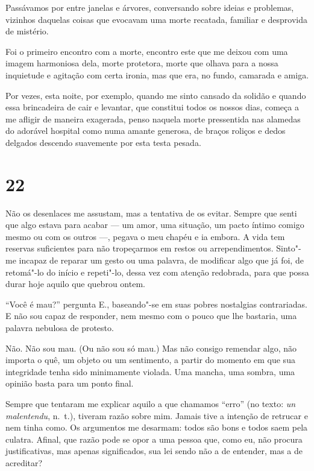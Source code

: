 Passávamos por entre janelas e árvores, conversando sobre ideias e
problemas, vizinhos daquelas coisas que evocavam uma morte recatada,
familiar e desprovida de mistério.

Foi o primeiro encontro com a morte, encontro este que me deixou com uma
imagem harmoniosa dela, morte protetora, morte que olhava para a nossa
inquietude e agitação com certa ironia, mas que era, no fundo, camarada
e amiga.

Por vezes, esta noite, por exemplo, quando me sinto cansado da solidão e
quando essa brincadeira de cair e levantar, que constitui todos os
nossos dias, começa a me afligir de maneira exagerada, penso naquela
morte pressentida nas alamedas do adorável hospital como numa amante
generosa, de braços roliços e dedos delgados descendo suavemente por
esta testa pesada.

\section{22}

Não os desenlaces me assustam, mas a tentativa de os evitar. Sempre que
senti que algo estava para acabar --- um amor, uma situação, um pacto
íntimo comigo mesmo ou com os outros ---, pegava o meu chapéu e ia embora.
A vida tem reservas suficientes para não tropeçarmos em restos ou
arrependimentos. Sinto"-me incapaz de reparar um gesto ou uma palavra, de
modificar algo que já foi, de retomá"-lo do início e repeti"-lo, dessa vez
com atenção redobrada, para que possa durar hoje aquilo que quebrou
ontem.

``Você é mau?'' pergunta E., baseando"-se em suas pobres nostalgias
contrariadas. E não sou capaz de responder, nem mesmo com o pouco que
lhe bastaria, uma palavra nebulosa de protesto.

Não. Não sou mau. (Ou não sou só mau.) Mas não consigo remendar algo,
não importa o quê, um objeto ou um sentimento, a partir do momento em
que sua integridade tenha sido minimamente violada. Uma mancha, uma
sombra, uma opinião basta para um ponto final.

Sempre que tentaram me explicar aquilo a que chamamos ``erro'' (no
texto: \emph{un malentendu}, n.~t.), tiveram razão sobre mim. Jamais tive
a intenção de retrucar e nem tinha como. Os argumentos me desarmam:
todos são bons e todos saem pela culatra. Afinal, que razão pode se opor
a uma pessoa que, como eu, não procura justificativas, mas apenas
significados, sua lei sendo não a de entender, mas a de acreditar?

